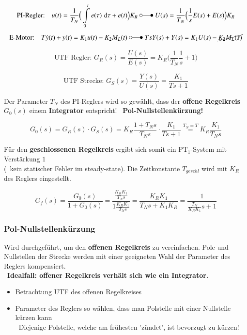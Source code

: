 \vspace{-0.4cm}
$$ \text{PI-Regler:} \quad u(t) = \frac{1}{T_N} \Big( \int\limits_0^t e(\tau) \, \diff \tau + e(t) \Big) K_R
    \; \laplace \; U(s) = \frac{1}{T_N} \Big( \frac{1}{s} E(s) + E(s) \Big) K_R $$
$$ \text{E-Motor:} \quad T \dot{y}(t) + y(t) = K_1 u(t) - K_2 M_L(t) 
    \; \laplace \; T s Y(s) + Y(s) = K_1 U(s) - \cancel{ K_2 M_L(s)} $$

\vspace{-0.3cm}
\begin{minipage}[t]{0.5\columnwidth}
    $$ \text{UTF Regler: } G_R(s) = \frac{U(s)}{E(s)} = K_R \Big( \frac{1}{T_N} \frac{1}{s} + 1 \Big) $$
\end{minipage}
\hfill
\begin{minipage}[t]{0.46\columnwidth}
    $$ \text{UTF Strecke: } G_S(s) = \frac{Y(s)}{U(s)} = \frac{K_1}{T s + 1} $$
\end{minipage}

Der  Parameter $T_N$ des PI-Reglers wird so gewählt, dass der \textbf{offene Regelkreis} $G_0(s)$ einem \textbf{Integrator} entspricht!
\textrightarrow\ \textbf{Pol-Nullstellenkürzung!}

$$ G_0(s) = G_R(s) \cdot G_S(s) = K_R \frac{1 + T_N s}{T_N s} \cdot \frac{K_1}{T s + 1} \overset{T_N = T}{=} K_R \frac{K_1}{T_N s} $$

Für den \textbf{geschlossenen Regelkreis} ergibt sich somit ein $\text{PT}_1$-System mit Verstärkung $1$\\
(\textrightarrow\ kein statischer Fehler im steady-state). Die Zeitkonstante $T_{geschl}$ wird mit $K_R$ des Reglers eingestellt.

$$ G_f(s) = \frac{G_0(s)}{1 + G_0(s)} =  \frac{\frac{K_R  K_1}{T_N s} }{1 \frac{K_R  K_1}{T_N s}} = \frac{K_R K_1}{T_N s + K_1 K_R} = \frac{1}{\frac{T_N}{K_R  K_1}s + 1} $$


\subsubsection{Pol-Nullstellenkürzung}

Wird durchgeführt, um den \textbf{offenen Regelkreis} zu vereinfachen. Pole und Nullstellen der Strecke werden mit einer geeigneten
Wahl der Parameter des Reglers kompensiert. \\
\textrightarrow\ \textbf{Idealfall: offener Regelkreis verhält sich wie ein Integrator.}

\begin{itemize}
    \item Betrachtung UTF des offenen Regelkreises
    \item Parameter des Reglers so wählen, dass man Polstelle mit einer Nullstelle kürzen kann \\
        \textrightarrow\ Diejenige Polstelle, welche am frühesten 'zündet', ist bevorzugt zu kürzen!
\end{itemize}


